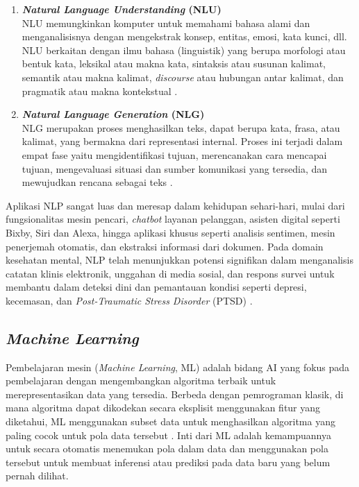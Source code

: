 \begin{enumerate}
	\item \textbf{\textit{Natural Language Understanding} (NLU)} \\
	      NLU memungkinkan komputer untuk memahami bahasa alami dan menganalisisnya dengan mengekstrak konsep, entitas, emosi, kata kunci, dll.
	      NLU berkaitan dengan ilmu bahasa (linguistik) yang berupa morfologi atau bentuk kata, leksikal atau makna kata, sintaksis atau susunan kalimat, semantik atau makna kalimat, \textit{discourse} atau hubungan antar kalimat, dan pragmatik atau makna kontekstual \cite{Khurana2022AboutNLP}.
	\item \textbf{\textit{Natural Language Generation} (NLG)} \\
	      NLG merupakan proses menghasilkan teks, dapat berupa kata, frasa, atau kalimat, yang bermakna dari representasi internal.
	      Proses ini terjadi dalam empat fase yaitu mengidentifikasi tujuan, merencanakan cara mencapai tujuan, mengevaluasi situasi dan sumber komunikasi yang tersedia, dan mewujudkan rencana sebagai teks \cite{Khurana2022AboutNLP}.
\end{enumerate}

Aplikasi NLP sangat luas dan meresap dalam kehidupan sehari-hari, mulai dari fungsionalitas mesin pencari, \textit{chatbot} layanan pelanggan, asisten digital seperti Bixby, Siri dan Alexa, hingga aplikasi khusus seperti analisis sentimen, mesin penerjemah otomatis, dan ekstraksi informasi dari dokumen.
Pada domain kesehatan mental, NLP telah menunjukkan potensi signifikan dalam menganalisis catatan klinis elektronik, unggahan di media sosial, dan respons survei untuk membantu dalam deteksi dini dan pemantauan kondisi seperti depresi, kecemasan, dan \textit{Post-Traumatic Stress Disorder} (PTSD) \cite{NLPonMentalHealth}.

\subsection{\textit{Machine Learning}}
Pembelajaran mesin (\textit{Machine Learning}, ML) adalah bidang AI yang fokus pada pembelajaran dengan mengembangkan algoritma terbaik untuk merepresentasikan data yang tersedia.
Berbeda dengan pemrograman klasik, di mana algoritma dapat dikodekan secara eksplisit menggunakan fitur yang diketahui,
ML menggunakan subset data untuk menghasilkan algoritma yang paling cocok untuk pola data tersebut \cite{choi2020IntroductionML_NN_DL}.
Inti dari ML adalah kemampuannya untuk secara otomatis menemukan pola dalam data dan menggunakan pola tersebut untuk membuat inferensi atau prediksi pada data baru yang belum pernah dilihat.

